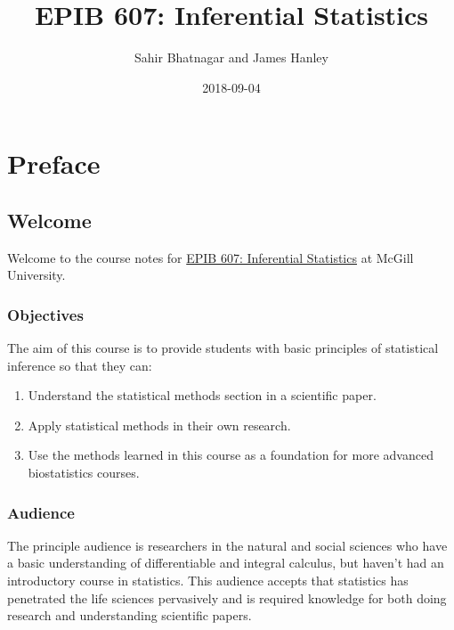 \documentclass[]{book}
\title{EPIB 607: Inferential Statistics}
\author{Sahir Bhatnagar and James Hanley}
\date{2018-09-04}
\providecommand{\tightlist}{%
  \setlength{\itemsep}{0pt}\setlength{\parskip}{0pt}}
\providecommand{\tightlist}{%
  \setlength{\itemsep}{0pt}\setlength{\parskip}{0pt}}
\begin{document}
\maketitle

{
\setcounter{tocdepth}{1}
\tableofcontents
}
\part{Preface}\label{part-preface}

\chapter*{Welcome}\label{welcome}

Welcome to the course notes for
\href{https://www.mcgill.ca/study/2018-2019/courses/epib-607}{EPIB 607:
Inferential Statistics} at McGill University.

\section*{Objectives}\label{objectives}

The aim of this course is to provide students with basic principles of
statistical inference so that they can:

\begin{enumerate}
\def\labelenumi{\arabic{enumi}.}
\tightlist
\item
  Understand the statistical methods section in a scientific paper.\\
\item
  Apply statistical methods in their own research.\\
\item
  Use the methods learned in this course as a foundation for more
  advanced biostatistics courses.
\end{enumerate}

\section*{Audience}\label{audience}

The principle audience is researchers in the natural and social sciences
who have a basic understanding of differentiable and integral calculus,
but haven't had an introductory course in statistics. This audience
accepts that statistics has penetrated the life sciences pervasively and
is required knowledge for both doing research and understanding
scientific papers.
\end{document}
